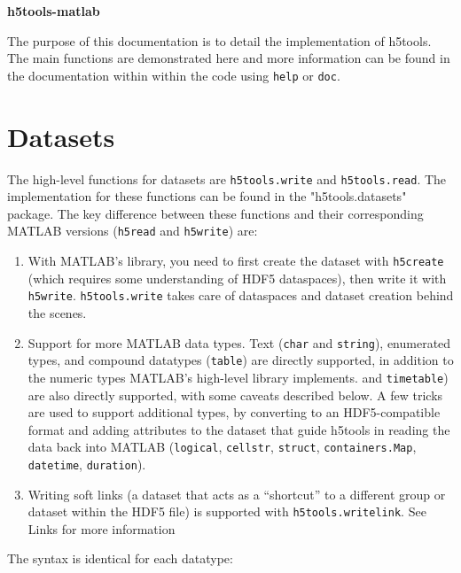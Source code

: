 \documentclass[11pt]{exam}
\newcommand\myfcn[1]{\colorbox{codegray}{\textcolor{codeblue}{\texttt{#1}}}}
\newcommand\matfcn[1]{\textcolor{darkteal}{\texttt{#1}}}
\begin{document}
	\begin{center}
		\textbf{\Huge h5tools-matlab}
	\end{center}

	\noindent The purpose of this documentation is to detail the implementation of h5tools. The main functions are demonstrated here and more information can be found in the documentation within within the code using \texttt{help} or \texttt{doc}. 
    \section{Datasets}
        \noindent The high-level functions for datasets are \myfcn{h5tools.write} and \myfcn{h5tools.read}. The implementation for these functions can be found in the "h5tools.datasets" package. The key difference between these functions and their corresponding MATLAB versions (\matfcn{h5read} and \matfcn{h5write}) are:
        \begin{enumerate}
            \item With MATLAB's library, you need to first create the dataset with \myfcn{h5create} (which requires some understanding of HDF5 dataspaces), then write it with \matfcn{h5write}. \myfcn{h5tools.write} takes care of dataspaces and dataset creation behind the scenes. 
            \item Support for more MATLAB data types. Text (\texttt{char} and \texttt{string}), enumerated types, and compound datatypes (\texttt{table}) are directly supported, in addition to the numeric types MATLAB's high-level library implements.  and \texttt{timetable}) are also directly supported, with some caveats described below. A few tricks are used to support additional types, by converting to an HDF5-compatible format and adding attributes to the dataset that guide h5tools in reading the data back into MATLAB (\texttt{logical}, \texttt{cellstr}, \texttt{struct}, \texttt{containers.Map}, \texttt{datetime}, \texttt{duration}).  
            \item Writing soft links (a dataset that acts as a ``shortcut'' to a different group or dataset within the HDF5 file) is supported with \myfcn{h5tools.writelink}. See Links for more information
        \end{enumerate}
        $\quad$\\
		The syntax is identical for each datatype:
\end{document}
